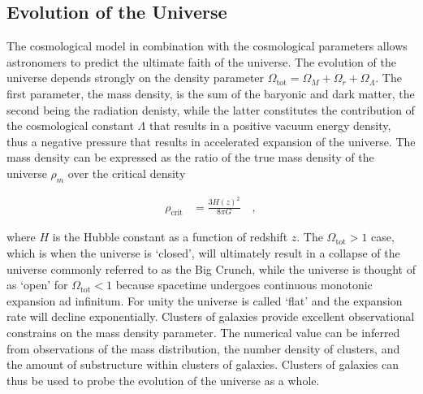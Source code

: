 \documentclass[MScProj_TLRH_ClusterEnergy.tex]{subfiles}
\begin{document}
\subsection*{Evolution of the Universe}
\label{sec:evolution}

The cosmological model in combination with the cosmological parameters allows
astronomers to predict the ultimate faith of the universe. The evolution of the 
universe depends strongly on the density parameter $\Omega_{\text{tot}}= 
\Omega_M + \Omega_r + \Omega_\Lambda$. The first parameter, the mass density, is 
the sum of the baryonic and dark matter, the second being the radiation denisty, 
while the latter constitutes the contribution of the cosmological constant 
$\Lambda$ that results in a positive vacuum energy density, thus a negative pressure
that results in accelerated expansion of the universe. The mass density can be 
expressed as the ratio of the true mass density of the universe $\rho_m$ over the 
critical density

\begin{align}
    \rho_{\text{crit}} &= \frac{3H(z)^2}{8\pi G} \label{eq:rhocrit} \quad ,
\end{align}

\noindent where $H$ is the Hubble constant as a function of redshift $z$.
The $\Omega_{\text{tot}} > 1$ case, which is when the universe is `closed',
will ultimately result in a collapse of the universe commonly referred to as the
Big Crunch, while the universe is thought of as `open' for $\Omega_{\text{tot}} < 1$
because spacetime undergoes continuous monotonic expansion ad infinitum. For unity 
the universe is called `flat' and the expansion rate will decline exponentially.
Clusters of galaxies provide excellent observational constrains on the mass density 
parameter. The numerical value can be inferred from observations of the mass 
distribution, the number density of clusters, and the amount of substructure within 
clusters of galaxies. Clusters of galaxies can thus be used to probe the evolution
of the universe as a whole.
\end{document}
